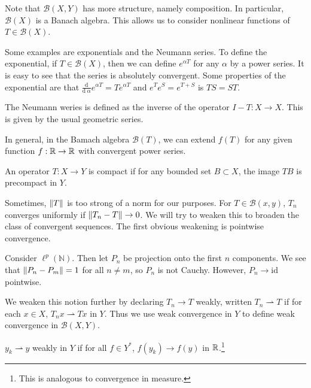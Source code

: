 \documentclass[10pt, twoside]{article}
\begin{document}
    Note that $\mathcal{B}(X,Y)$ has more structure, namely composition. In
    particular, $\mathcal{B}(X)$ is a Banach algebra. This allows us to
    consider nonlinear functions of $T \in \mathcal{B}(X)$.

    \begin{exm} Some examples are exponentials and the Neumann series. To
        define the exponential, if $T \in \mathcal{B}(X)$, then we can define
        $e^{\alpha T}$ for any $\alpha$ by a power series. It is easy to see
        that the series is absolutely convergent. Some properties of the
        exponential are that $\frac{\mathrm{d}}{\mathrm{d}\ \alpha} e^{\alpha
        T} = T e^{\alpha T}$ and $e^T e^S = e^{T+S}$ is $TS=ST$.

        The Neumann weries is defined as the inverse of the operator $I-T: X
    \to X$. This is given by the usual geometric series.  \end{exm}

    In general, in the Bamach algebra $\mathcal{B}(T)$, we can extend  $f(T)$
    for any given function $f: \mathbb{R} \to \mathbb{R}$ with convergent power series.

    \begin{defn} An operator $T: X \to Y$ is compact if for any bounded set $B
    \subset X$, the image $TB$ is precompact in $Y$.  \end{defn}

    Sometimes, $\lVert T\rVert$ is too strong of a norm for our purposes. For $T \in
    \mathcal{B}(x,y)$, $T_n$ converges uniformly if $\lVert T_n - T\rVert \to 0$. We
    will try to weaken this to broaden the class of convergent sequences. The
    first obvious weakening is pointwise convergence.

    \begin{exm} Consider $\ell^p(\mathbb{N})$. Then let $P_n$ be projection
    onto the first $n$ components. We see that $\lVert P_n - P_m\rVert = 1$ for all
$n \neq m$, so $P_n$ is not Cauchy. However, $P_n \to \mathrm{id}$ pointwise.
\end{exm}

    \begin{defn} We weaken this notion further by declaring
        $T_n \to T$ weakly, written $T_n \rightharpoonup T$ if for each $x \in
        X$, $T_nx \rightharpoonup Tx$ in $Y$. Thus we use weak convergence in
        $Y$ to define weak convergence in $\mathcal{B}(X,Y)$.  \end{defn}

    \begin{defn} $y_k \rightharpoonup y$ weakly in $Y$
    if for all $f \in Y^*$, $f(y_k) \to f(y)$ in $\mathbb{R}$.\footnote{This is
analogous to convergence in measure.} \end{defn}
\end{document}

